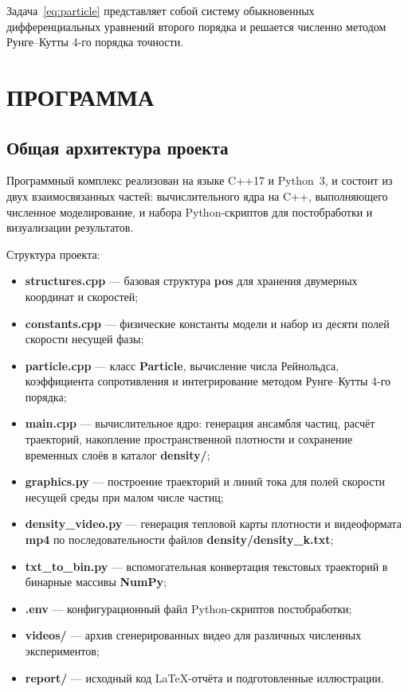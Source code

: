 \documentclass[14pt,a4paper]{extarticle}
\numberwithin{figure}{section}
\numberwithin{table}{section}
\begin{document}
Задача~\eqref{eq:particle} представляет собой систему обыкновенных дифференциальных
уравнений второго порядка и решается численно методом Рунге--Кутты 4-го порядка точности.


\newpage
\section{ПРОГРАММА}

\subsection{Общая архитектура проекта}

Программный комплекс реализован на языке C++17 и Python~3, и состоит из двух
взаимосвязанных частей: вычислительного ядра на C++, выполняющего численное
моделирование, и набора Python-скриптов для постобработки и визуализации результатов.

Структура проекта:

\begin{itemize}
    \item \textbf{structures.cpp} --- базовая структура \textbf{pos} для хранения двумерных координат и скоростей;
    \item \textbf{constants.cpp} --- физические константы модели и набор из десяти полей скорости несущей фазы;
    \item \textbf{particle.cpp} --- класс \textbf{Particle}, вычисление числа Рейнольдса, коэффициента сопротивления и интегрирование методом Рунге--Кутты 4-го порядка;
    \item \textbf{main.cpp} --- вычислительное ядро: генерация ансамбля частиц, расчёт траекторий, накопление пространственной плотности и сохранение временных слоёв в каталог \textbf{density/};
    \item \textbf{graphics.py} --- построение траекторий и линий тока для полей скорости несущей среды при малом числе частиц;
    \item \textbf{density\_video.py} --- генерация тепловой карты плотности и видеоформата \textbf{mp4} по последовательности файлов \textbf{density/density\_k.txt};
    \item \textbf{txt\_to\_bin.py} --- вспомогательная конвертация текстовых траекторий в бинарные массивы \textbf{NumPy};
    \item \textbf{.env} --- конфигурационный файл Python-скриптов постобработки;
    \item \textbf{videos/} --- архив сгенерированных видео для различных численных экспериментов;
    \item \textbf{report/} --- исходный код \LaTeX-отчёта и подготовленные иллюстрации.
\end{itemize}
\end{document}
